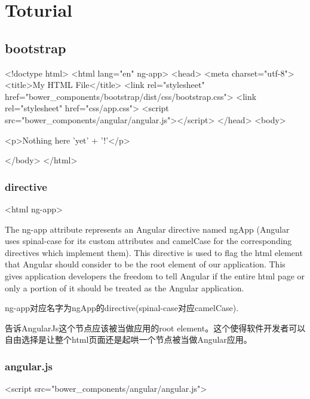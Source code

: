 \section{Toturial}

\subsection{bootstrap}

\begin{HTML5}
<!doctype html>
<html lang="en" ng-app>
<head>
  <meta charset="utf-8">
  <title>My HTML File</title>
  <link rel="stylesheet" href="bower_components/bootstrap/dist/css/bootstrap.css">
  <link rel="stylesheet" href="css/app.css">
  <script src="bower_components/angular/angular.js"></script>
</head>
<body>

  <p>Nothing here {{'yet' + '!'}}</p>

</body>
</html>
\end{HTML5}


\subsubsection{directive}

\begin{HTML5}[ng-app]
<html ng-app>
\end{HTML5}

The ng-app attribute represents an Angular directive named ngApp (Angular uses spinal-case for its custom attributes and camelCase for the corresponding directives which implement them). This directive is used to flag the html element that Angular should consider to be the root element of our application. This gives application developers the freedom to tell Angular if the entire html page or only a portion of it should be treated as the Angular application.


ng-app对应名字为ngApp的directive(spinal-case对应camelCase).

告诉AngularJs这个节点应该被当做应用的root element。这个使得软件开发者可以自由选择是让整个html页面还是起哄一个节点被当做Angular应用。

\subsubsection{angular.js}

\begin{HTML5}[ng-app]
<script src="bower_components/angular/angular.js">
\end{HTML5}

